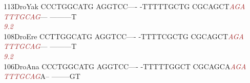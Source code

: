 \documentclass[11pt,twoside,reqno,a4paper]{article}
\begin{document}
{113\hspace*{1\charwidth}DroYak	CCCTGGCATG	AGGTCC----	-TTTTTGCTG	CGCAGCT\textit{\textcolor{Brown}{A}}\textit{\textcolor{Brown}{G}}\textit{\textcolor{Brown}{A}}	\textit{\textcolor{Brown}{T}}\textit{\textcolor{Brown}{T}}\textit{\textcolor{Brown}{T}}\textit{\textcolor{Brown}{G}}\textit{\textcolor{Brown}{C}}\textit{\textcolor{Brown}{A}}\textit{\textcolor{Brown}{G}}---	---------T	\\
\hspace*{4\charwidth}\hspace*{7\charwidth}\hspace*{1\charwidth}\hspace*{1\charwidth}\hspace*{1\charwidth}\hspace*{37\charwidth}\textit{\textcolor{Brown}{9.2}}\hspace*{1\charwidth}\hspace*{1\charwidth}\hspace*{1\charwidth}\\
108\hspace*{1\charwidth}DroEre	CCTTGGCATG	AGGTCC----	-TTTTCGCTG	CGCAGCT\textit{\textcolor{Brown}{A}}\textit{\textcolor{Brown}{G}}\textit{\textcolor{Brown}{A}}	\textit{\textcolor{Brown}{T}}\textit{\textcolor{Brown}{T}}\textit{\textcolor{Brown}{T}}\textit{\textcolor{Brown}{G}}\textit{\textcolor{Brown}{C}}\textit{\textcolor{Brown}{A}}\textit{\textcolor{Brown}{G}}---	---------T	\\
\hspace*{4\charwidth}\hspace*{7\charwidth}\hspace*{1\charwidth}\hspace*{1\charwidth}\hspace*{1\charwidth}\hspace*{37\charwidth}\textit{\textcolor{Brown}{9.2}}\hspace*{1\charwidth}\hspace*{1\charwidth}\hspace*{1\charwidth}\\
106\hspace*{1\charwidth}DroAna	CCCTGGCATG	AGGTCC----	-TTTTTGGCT	CGCAGCA\textit{\textcolor{Brown}{A}}\textit{\textcolor{Brown}{G}}\textit{\textcolor{Brown}{A}}	\textit{\textcolor{Brown}{T}}\textit{\textcolor{Brown}{T}}\textit{\textcolor{Brown}{T}}\textit{\textcolor{Brown}{G}}\textit{\textcolor{Brown}{C}}\textit{\textcolor{Brown}{A}}\textit{\textcolor{Brown}{G}}A--	--------GT	\\
}
\end{document}
